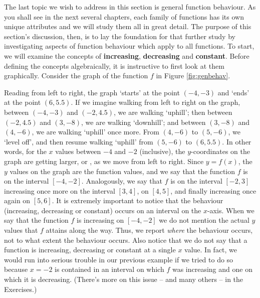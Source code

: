 The last topic we wish to address in this section is general function behaviour.  As you shall see in the next several chapters, each family of functions has its own unique attributes and we will study them all in great detail.  The purpose of this section's discussion, then, is to lay the foundation for that further study by investigating aspects of function behaviour which apply to all functions.  To start, we will examine the concepts of  {\bf increasing},  {\bf decreasing} and  {\bf constant}.  Before defining the concepts algebraically, it is instructive to first look at them graphically.  Consider the graph of the function $f$ in Figure \ref{fig:genbehav}.

Reading from left to right, the graph `starts' at the point $(-4,-3)$ and `ends' at the point $(6,5.5)$.  If we imagine walking from left to right on the graph, between $(-4,-3)$ and $(-2,4.5)$, we are walking `uphill'; then between $(-2,4.5)$ and $(3,-8)$, we are walking `downhill'; and between $(3,-8)$ and $(4,-6)$, we are walking `uphill' once more.  From $(4,-6)$ to $(5, -6)$, we `level off', and then resume walking `uphill' from $(5,-6)$ to $(6,5.5)$.  In other words, for the $x$ values between $-4$ and $-2$ (inclusive), the $y$-coordinates on the graph are getting larger, or  , as we move from left to right.  Since $y = f(x)$, the $y$ values on the graph are the function values, and we say that the function $f$ is  on the interval $[-4,-2]$.  Analogously, we say that $f$ is   on the interval $[-2,3]$ increasing once more on the interval $[3,4]$,   on $[4,5]$, and finally increasing once again on $[5,6]$.  It is extremely important to notice that the behaviour (increasing, decreasing or constant) occurs on an interval on the $x$-axis.  When we say that the function $f$ is increasing on $[-4, -2]$ we do not mention the actual $y$ values that $f$ attains along the way.  Thus, we report \emph{where} the behaviour occurs, not to what extent the behaviour occurs. Also notice that we do not say that a function is increasing, decreasing or constant at a single $x$ value.  In fact, we would run into serious trouble in our previous example if we tried to do so because $x = -2$ is contained in an interval on which $f$ was increasing and one on which it is decreasing.  (There's more on this issue -- and many others -- in the Exercises.) 

